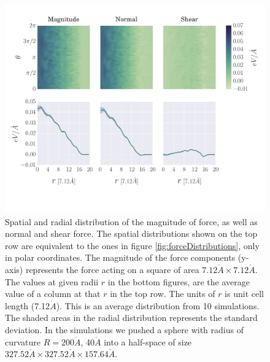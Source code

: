 \documentclass[twoside,english]{uiofysmaster}
\begin{document}
\vspace{5mm}
\begin{figure}[H]
	\centering
	\includegraphics[width=\linewidth, trim={8mm 42mm 12mm 17mm}, clip]{figures/forceDistribution/radialResults/ALL_timestep_110000.pdf}
	\vspace{0mm}
	\caption{Spatial and radial distribution of the magnitude of force, as well as normal and shear force. 
		The spatial distributions shown on the top row are equivalent to the ones in figure \ref{fig:forceDistributions}, only in polar coordinates. 
		The magnitude of the force components (y-axis) represents the force acting on a square of area $7.12\mathring{A}\times7.12\mathring{A}$.
		The values at given radii $r$ in the bottom figures, are the average value of a column at that $r$ in the top row.
		The units of $r$ is unit cell length (7.12$\mathring{A}$).
		This is an average distribution from 10 simulations. 
		The shaded areas in the radial distribution represents the standard deviation.
		In the simulations we pushed a sphere with radius of curvature $R=200\mathring{A}$,  40$\mathring{A}$ into a half-space of size $327.52\mathring{A} \times 327.52\mathring{A} \times 157.64 \mathring{A}$. 
		}
	\label{fig:radialdistribution110000}
\end{figure}
\end{document}
